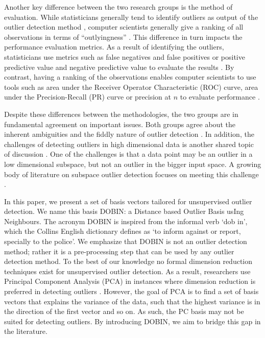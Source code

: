 \documentclass[a4paper,11pt]{article}
\begin{document}
Another key difference between the two research groups is the method of evaluation. While statisticians generally tend to identify outliers as output of the outlier detection method \citep{billor2000bacon, wilkinson2017visualizing, rousseeuw2018detecting}, computer scientists generally give a ranking of all observations in terms of ``outlyingness'' \citep{breunig2000lof, liu2008isolation, kriegel2009loop}. This difference in turn impacts the performance evaluation metrics. As a result of identifying the outliers, statisticians use metrics such as false negatives and  false positives or positive predictive value and negative predictive value to evaluate the results \citep{wilkinson2017visualizing}. By contrast,  having a ranking of the observations enables computer scientists to use tools such as area under the Receiver Operator Characteristic (ROC) curve, area under the Precision-Recall (PR) curve or precision at $n$ to evaluate performance \citep{campos2016evaluation}.

Despite these differences between the methodologies, the two groups are in fundamental agreement on important issues. Both groups agree about the inherent ambiguities and the fiddly nature of outlier detection \citep{unwin2019multivariate, campos2016evaluation}. In addition, the challenges of detecting outliers in high dimensional data is another shared topic of discussion \citep{unwin2019multivariate, zimek2012survey}. One of the challenges is that a data point may be an outlier in a low dimensional subspace, but not an outlier in the bigger input space. A growing body of literature on subspace outlier detection  focuses on meeting this challenge \citep{aggarwal2001outlier, keller2012hics}.

In this paper, we present a set of basis vectors tailored for unsupervised outlier detection. We name this basis DOBIN: a Distance based Outlier Basis usIng Neighbours. The acronym DOBIN is inspired from the informal verb `dob in', which the Collins English dictionary defines as `to inform against or report, specially to the police'.  We emphasize that DOBIN is not an outlier detection method;  rather it is a pre-processing step that can be used by any outlier detection method. To the best of our knowledge no formal dimension reduction techniques exist for unsupervised outlier detection. As a result, researchers use Principal Component Analysis (PCA) in instances where dimension reduction is preferred in detecting outliers \citep{talagala2019anomaly, hyndman2015large}. However, the goal of PCA is to find a set of basis vectors that explains the variance of the data, such that the highest variance  is in the direction of the first vector and so on. As such, the PC basis may not be suited for detecting outliers. By introducing DOBIN, we aim to bridge this gap in the literature.
\end{document}

